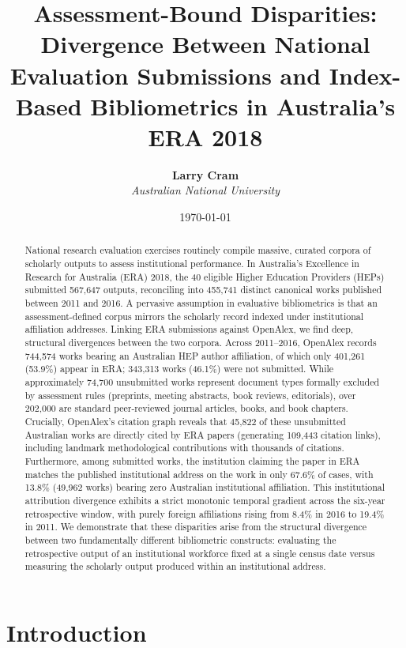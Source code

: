 \documentclass[11pt,a4paper]{article}
\title{\textbf{Assessment-Bound Disparities: Divergence Between National Evaluation Submissions and Index-Based Bibliometrics in Australia's ERA 2018}}
\author{
    \textbf{Larry Cram} \\
    \textit{Australian National University}
}
\date{\today}
\begin{document}
\maketitle

\begin{abstract}
National research evaluation exercises routinely compile massive, curated corpora of scholarly outputs to assess institutional performance. In Australia's Excellence in Research for Australia (ERA) 2018, the 40 eligible Higher Education Providers (HEPs) submitted 567,647 outputs, reconciling into 455,741 distinct canonical works published between 2011 and 2016. A pervasive assumption in evaluative bibliometrics is that an assessment-defined corpus mirrors the scholarly record indexed under institutional affiliation addresses. Linking ERA submissions against OpenAlex, we find deep, structural divergences between the two corpora. Across 2011--2016, OpenAlex records 744,574 works bearing an Australian HEP author affiliation, of which only 401,261 (53.9\%) appear in ERA; 343,313 works (46.1\%) were not submitted. While approximately 74,700 unsubmitted works represent document types formally excluded by assessment rules (preprints, meeting abstracts, book reviews, editorials), over 202,000 are standard peer-reviewed journal articles, books, and book chapters. Crucially, OpenAlex's citation graph reveals that 45,822 of these unsubmitted Australian works are directly cited by ERA papers (generating 109,443 citation links), including landmark methodological contributions with thousands of citations. Furthermore, among submitted works, the institution claiming the paper in ERA matches the published institutional address on the work in only 67.6\% of cases, with 13.8\% (49,962 works) bearing zero Australian institutional affiliation. This institutional attribution divergence exhibits a strict monotonic temporal gradient across the six-year retrospective window, with purely foreign affiliations rising from 8.4\% in 2016 to 19.4\% in 2011. We demonstrate that these disparities arise from the structural divergence between two fundamentally different bibliometric constructs: evaluating the retrospective output of an institutional workforce fixed at a single census date versus measuring the scholarly output produced within an institutional address.
\end{abstract}

\section{Introduction}
\end{document}
